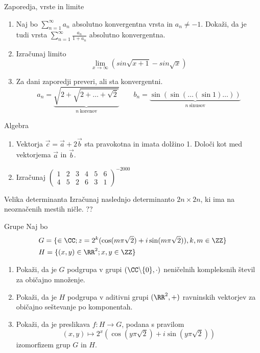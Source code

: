 \begin{frame}{Zaporedja, vrste in limite}
	\begin{enumerate}
		\item 
		Naj bo $\sum_{n=1}^{\infty} a_n$ absolutno konvergentna vrsta in $a_n \ne -1$.
		Dokaži, da je tudi vrsta $\sum_{n=1}^\infty \frac{a_n}{1+a_n}$
		absolutno konvergentna.

		\item
		Izračunaj limito
		$$\lim_{x\longrightarrow\infty}(sin\sqrt{x+1}- sin\sqrt{x})$$

		\item
		Za dani zaporedji preveri, ali sta konvergentni.
		$$ a_n = \underbrace{\sqrt{2+\sqrt{2+\dots+\sqrt{2}}}}_{n~\text{korenov}} \qquad
		 b_n = \underbrace{\sin(\sin(\dots(\sin 1)\dots))}_{n~\text{sinusov}} $$
	\end{enumerate}
\end{frame}

\begin{frame}{Algebra}
	\begin{enumerate}
		\item
		Vektorja $\vec{c} = \vec{a} + 2 \vec{b} $
		sta pravokotna in imata dolžino 1. Določi kot med vektorjema $\vec{a}$ in $\vec{b}$.
		\item 
		Izračunaj
		$ \begin{pmatrix}
1 & 2 & 3 & 4 & 5 & 6\\
4 & 5 & 2 & 6 & 3 & 1
\end{pmatrix}^{-2000}  $
	\end{enumerate}
\end{frame}

\begin{frame}{Velika determinanta}
	Izračunaj naslednjo determinanto $2n \times 2n$, ki ima na neoznačenih mestih ničle.
 ??
\end{frame}

\begin{frame}{Grupe}
	Naj bo
\begin{align*}
		 &G = \{ \in \CC; z = 2^k (\cos(m\pi \sqrt{2})+ i \sin(m\pi\sqrt{2})),k,m \in \ZZ \} \\
		 &H = \{ (x,y) \in \RR^2; x,y \in \ZZ \} 
\end{align*}
	\begin{enumerate}
		\item
			Pokaži, da je $G$ podgrupa v grupi $(\CC \backslash \{0\}, \cdot) $
			neničelnih kompleksnih števil za običajno množenje.
		\item
			Pokaži, da je $H$ podgrupa v aditivni grupi $ (\RR^2, +)$
			ravninskih vektorjev za običajno seštevanje po komponentah.
		\item
			Pokaži, da je preslikava $f:H\to G$, podana s pravilom
			$$ (x,y) \mapsto 2^x(\cos(y\pi\sqrt{2})+i \sin(y\pi\sqrt{2})) $$
			izomorfizem grup $G$ in $H$.
	\end{enumerate}
\end{frame}
